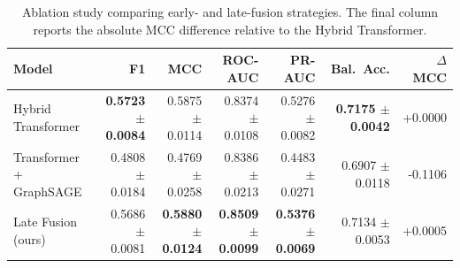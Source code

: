 \begin{table}[t]
\centering
\small
\caption{Ablation study comparing early- and late-fusion strategies. The final column reports the absolute MCC difference relative to the Hybrid Transformer.}
\label{tab:fusion-ablation}
\begin{tabular}{lrrrrrr}
\toprule
Model & F1 & MCC & ROC-AUC & PR-AUC & Bal.\ Acc. & $\Delta$ MCC \\
\midrule
Hybrid Transformer & \textbf{0.5723 $\pm$ 0.0084} & 0.5875 $\pm$ 0.0114 & 0.8374 $\pm$ 0.0108 & 0.5276 $\pm$ 0.0082 & \textbf{0.7175 $\pm$ 0.0042} & +0.0000 \\
Transformer + GraphSAGE & 0.4808 $\pm$ 0.0184 & 0.4769 $\pm$ 0.0258 & 0.8386 $\pm$ 0.0213 & 0.4483 $\pm$ 0.0271 & 0.6907 $\pm$ 0.0118 & -0.1106 \\
Late Fusion (ours) & 0.5686 $\pm$ 0.0081 & \textbf{0.5880 $\pm$ 0.0124} & \textbf{0.8509 $\pm$ 0.0099} & \textbf{0.5376 $\pm$ 0.0069} & 0.7134 $\pm$ 0.0053 & +0.0005 \\
\bottomrule
\end{tabular}
\end{table}
